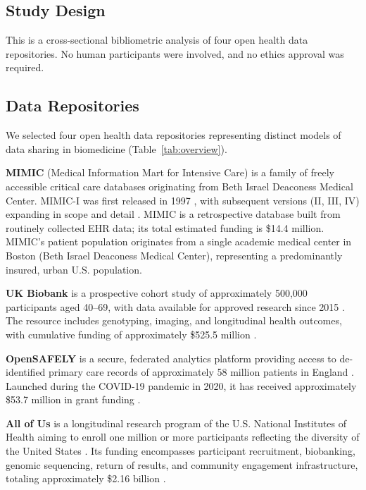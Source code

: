 \documentclass[11pt]{article}
\begin{document}
\subsection{Study Design}

This is a cross-sectional bibliometric analysis of four open health data repositories.
No human participants were involved, and no ethics approval was required.

\subsection{Data Repositories}
\label{sec:repositories}

We selected four open health data repositories representing distinct models of data sharing in biomedicine (Table~\ref{tab:overview}).

\textbf{MIMIC} (Medical Information Mart for Intensive Care) is a family of freely accessible critical care databases originating from Beth Israel Deaconess Medical Center.
MIMIC-I was first released in 1997 \cite{saul1992mimic}, with subsequent versions (II, III, IV) expanding in scope and detail \cite{johnson2016mimic,johnson2023mimic}.
MIMIC is a retrospective database built from routinely collected EHR data; its total estimated funding is \$14.4 million.
MIMIC's patient population originates from a single academic medical center in Boston (Beth Israel Deaconess Medical Center), representing a predominantly insured, urban U.S. population.

\textbf{UK Biobank} is a prospective cohort study of approximately 500,000 participants aged 40--69, with data available for approved research since 2015 \cite{sudlow2015ukbiobank}.
The resource includes genotyping, imaging, and longitudinal health outcomes, with cumulative funding of approximately \$525.5 million \cite{bycroft2018ukbiobank}.

\textbf{OpenSAFELY} is a secure, federated analytics platform providing access to de-identified primary care records of approximately 58 million patients in England \cite{williamson2020opensafely}.
Launched during the COVID-19 pandemic in 2020, it has received approximately \$53.7 million in grant funding \cite{goldacre2022opensafely}.

\textbf{All of Us} is a longitudinal research program of the U.S. National Institutes of Health aiming to enroll one million or more participants reflecting the diversity of the United States \cite{allofus2019}.
Its funding encompasses participant recruitment, biobanking, genomic sequencing, return of results, and community engagement infrastructure, totaling approximately \$2.16 billion \cite{haendel2021nhgri}.
\end{document}
